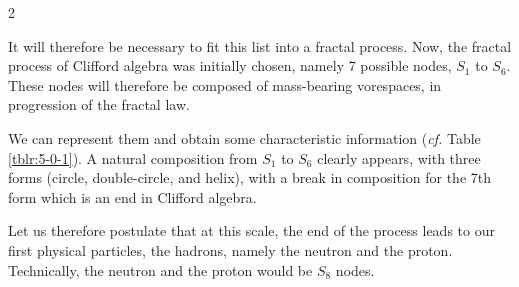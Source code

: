 \begin{multicols}{2}
	
	It will therefore be necessary to fit this list into a fractal process. Now, the 
	fractal process of Clifford algebra was initially chosen, namely 7 possible 
	nodes, $S_1$ to $S_6$. These nodes will therefore be composed of mass-bearing 
	vorespaces, in progression of the fractal law.
	
	We can represent them and obtain some characteristic information (\textit{cf.} 
	Table \ref{tblr:5-0-1}). A natural composition from $S_1$ to $S_6$ clearly 
	appears, with three forms (circle, double-circle, and helix), with a break 
	in composition for the 7th form which is an end in Clifford algebra.
	
	Let us therefore postulate that at this scale, the end of the process 
	leads to our first physical particles, the hadrons, namely the neutron and 
	the proton. Technically, the neutron and the proton would be $S_8$ nodes.
	\vfill\strut
	
	\begin{table}[H]
		\centering
		\caption{\footnotesize{\textbf{Nodes of the Clifford algebra $S_{7,0}(\mathbb{R}$)}}}
		\label{tblr:5-0-1}
\end{table}
\end{multicols}
